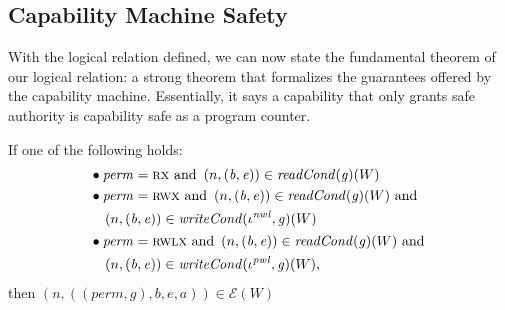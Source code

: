 \documentclass[format=acmsmall, review=true, screen=true]{acmart}
\newcommand{\var}[1]{\mathit{#1}}
\newcommand{\gl}{\var{g}}
\newcommand{\addr}{\var{a}}
\newcommand{\start}{\var{b}}
\newcommand{\addrend}{\var{e}}
\newcommand{\perm}{\var{perm}}
\newcommand{\nwl}{\var{nwl}}
\newcommand{\pwl}{\var{pwl}}
\newcommand{\plainfun}[2]{
  \ifthenelse{\equal{#2}{}}
  {\mathit{#1}}
  {\mathit{#1}(#2)}
}
\newcommand{\readCond}[1]{\plainfun{readCond}{#1}}
\newcommand{\writeCond}[1]{\plainfun{writeCond}{#1}}
\newcommand{\asmType}{\plaindom{AsmType}}
\newcommand{\plaindom}[1]{\mathrm{#1}}
\newcommand{\intr}[2]{\mathcal{#1}}
\newcommand{\exprintr}[1]{\intr{E}{#1}}
\newcommand{\stder}{\exprintr{\asmType}}
\newcommand{\npair}[2][n]{\left(#1,#2 \right)}
\newcommand{\plainperm}[1]{\textsc{#1}}
\newcommand{\exec}{\plainperm{rx}}
\newcommand{\rwx}{\plainperm{rwx}}
\newcommand{\rwlx}{\plainperm{rwlx}}
\begin{document}
\subsection{Capability Machine Safety}
With the logical relation defined, we can now state the fundamental theorem of
our logical relation: a strong theorem that formalizes the guarantees offered by
the capability machine. Essentially, it says a capability that only grants safe
authority is capability safe as a program counter.
\begin{theorem}
  \label{thm:ftlr}
  If one of the following holds:
  \begin{align*}
      & \bullet
        \begin{aligned}[t]
        &\perm = \exec \text{ and }\npair{(\start,\addrend)} \in \readCond{}(\gl)(W)
      \end{aligned} \\
    & \bullet 
      \begin{aligned}[t]
        &\perm = \rwx \text{ and } \npair{(\start,\addrend)} \in \readCond{}(\gl)(W) \text{ and }\\
        &\npair{(\start,\addrend)} \in \writeCond{}(\iota^\nwl,\gl)(W)
      \end{aligned} \\
    & \bullet 
      \begin{aligned}[t]
        &\perm = \rwlx \text{ and }\npair{(\start,\addrend)} \in \readCond{}(\gl)(W) \text{ and }\\
        &\npair{(\start,\addrend)} \in \writeCond{}(\iota^\pwl,\gl)(W),
      \end{aligned}
  \end{align*}
  then $\npair{((\perm,\gl),\start,\addrend,\addr)} \in \stder(W)$
\end{theorem}
\end{document}
